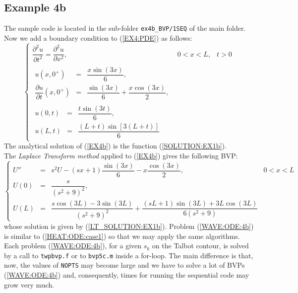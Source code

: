 \documentclass[a4paper,10pt]{report}%
\begin{document}
\subsection{Example 4b}
The sample code is located in the sub-folder {\tt ex4b\_BVP/1SEQ} of the main folder.
\\
Now we add a boundary condition to (\ref{EX4:PDE}) as follows:
\begin{equation}\label{EX4b}
\left\{\begin{array}{lll}
\dfrac{\partial^2 u}{\partial t^2} = \dfrac{\partial^2 u}{\partial x^2}, &  0<x<L, & t > 0 \\[4pt]
\begin{array}{lcl}
  u(x,0^+)   &=& \dfrac{x\sin(3x)}{6}, \\[8pt]
  \dfrac{\partial u}{\partial t}(x,0^+) &=& \dfrac{\sin(3x)}{6} + \dfrac{x\cos(3x)}{2},
\end{array} \\[24pt]
\begin{array}{lcl}
  u(0,t) &=& \dfrac{t\sin(3t)}{6}, \\[8pt]
  u(L,t) &=& \dfrac{(L+t)\sin[3(L+t)]}{6}
\end{array}
\end{array}\right.
\end{equation}
The analytical solution of (\ref{EX4b}) is the function (\ref{SOLUTION:EX1b}).
\\
The {\em Laplace Transform method} applied to (\ref{EX4b}) gives the following BVP:
\begin{equation}\label{WAVE:ODE:4b}
\left\{\begin{array}{lcll}
 U'' &=& s^2 U - (sx+1)\dfrac{\sin(3x)}{6} - x\dfrac{\cos(3x)}{2},  & 0 < x < L \\[8pt]
U(0) &=& \dfrac{s}{(s^2 + 9)^2}, \\[8pt]
U(L) &=& \dfrac{s\cos(3L)-3\sin(3L)}{(s^2 + 9)^2} + \dfrac{(sL+1)\sin(3L)+3L\cos(3L)}{6(s^2 + 9)}
\end{array}\right.
\end{equation}
whose solution is given by (\ref{LT_SOLUTION:EX1b}). Problem (\ref{WAVE:ODE:4b}) is similar
to (\ref{HEAT:ODE:case1}) so that we may apply the same algorithms. 
Each problem (\ref{WAVE:ODE:4b}), for a given $s_k$ on the Talbot contour, is solved by a call to
{\tt twpbvp.f} or to {\tt bvp5c.m} inside a for-loop. The main difference is that, now, the values of
{\tt NOPTS} may become large and we have to solve a lot of BVPs (\ref{WAVE:ODE:4b}) and,
consequently, times for running the sequential code may grow very much.
\end{document}
